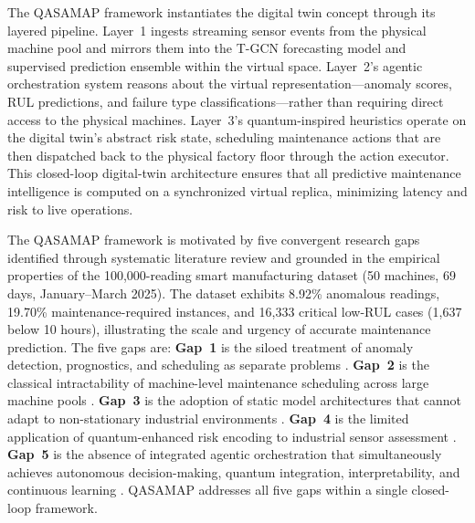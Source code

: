 
The QASAMAP framework instantiates the digital twin concept through its layered pipeline. Layer~1 ingests streaming sensor events from the physical machine pool and mirrors them into the T-GCN forecasting model and supervised prediction ensemble within the virtual space. Layer~2's agentic orchestration system reasons about the virtual representation---anomaly scores, RUL predictions, and failure type classifications---rather than requiring direct access to the physical machines. Layer~3's quantum-inspired heuristics operate on the digital twin's abstract risk state, scheduling maintenance actions that are then dispatched back to the physical factory floor through the action executor. This closed-loop digital-twin architecture ensures that all predictive maintenance intelligence is computed on a synchronized virtual replica, minimizing latency and risk to live operations.

The QASAMAP framework is motivated by five convergent research gaps identified through systematic literature review and grounded in the empirical properties of the 100,000-reading smart manufacturing dataset (50 machines, 69 days, January--March 2025). The dataset exhibits 8.92\% anomalous readings, 19.70\% maintenance-required instances, and 16,333 critical low-RUL cases (1,637 below 10 hours), illustrating the scale and urgency of accurate maintenance prediction. The five gaps are: \textbf{Gap~1} is the siloed treatment of anomaly detection, prognostics, and scheduling as separate problems \cite{Chalapathy2019, pang_deep_2021, Gao2022}. \textbf{Gap~2} is the classical intractability of machine-level maintenance scheduling across large machine pools \cite{Blekos2024, symons_practitioners_2023}. \textbf{Gap~3} is the adoption of static model architectures that cannot adapt to non-stationary industrial environments \cite{lee_autoencoder-based_2024}. \textbf{Gap~4} is the limited application of quantum-enhanced risk encoding to industrial sensor assessment \cite{kreplin_squlearn_2025}. \textbf{Gap~5} is the absence of integrated agentic orchestration that simultaneously achieves autonomous decision-making, quantum integration, interpretability, and continuous learning \cite{ouyang_llmsense_2024, xing_deepsqa_2021}. QASAMAP addresses all five gaps within a single closed-loop framework.

